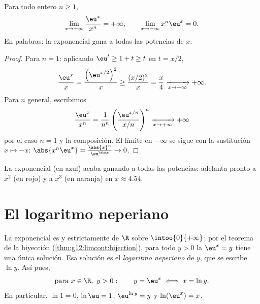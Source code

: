 \begin{theorem}\label{thm:g12:exp:growth}
Para todo entero $n \geq 1$,
\[
\lim_{x\to+\infty} \frac{\eu^x}{x^n} = +\infty,
\qquad
\lim_{x\to-\infty} x^n \eu^x = 0 .
\]
En palabras: la exponencial gana a todas las potencias de $x$.
\end{theorem}

\begin{proof}
Para $n = 1$: aplicando $\eu^t \geq 1 + t \geq t$ en $t = x/2$,
\[
\frac{\eu^x}{x} = \frac{\left(\eu^{x/2}\right)^2}{x}
\geq \frac{(x/2)^2}{x} = \frac{x}{4} \xrightarrow[x\to+\infty]{} +\infty .
\]
Para $n$ general, escribimos
\[
\frac{\eu^x}{x^n}
= \frac{1}{n^n}\left(\frac{\eu^{x/n}}{x/n}\right)^{n}
\xrightarrow[x\to+\infty]{} +\infty
\]
por el caso $n=1$ y la composición. El límite en $-\infty$ se sigue con la
sustitución $x \mapsto -x$:
$\abs{x^n \eu^x} = \frac{\abs{x}^n}{\eu^{\abs x}} \to 0$.
\end{proof}

\begin{omfigure}

{\small La exponencial (en azul) acaba ganando a todas las potencias:
adelanta pronto a $x^2$ (en rojo) y a $x^3$ (en naranja) en
$x \approx 4.54$.}
\end{omfigure}

\section{El logaritmo neperiano}

\begin{definition}\label{def:g12:exp:ln}
La exponencial es  y estrictamente  de $\R$ sobre
$\intoo{0}{+\infty}$; por el teorema de la biyección
(\cref{thm:g12:limcont:bijection}), para todo $y > 0$ la 
$\eu^x = y$ tiene una única solución. Esa solución es el \emph{logaritmo
neperiano} de $y$, que se escribe $\ln y$. Así pues,
\[
\text{para } x \in \R,\ y > 0: \qquad y = \eu^x \iff x = \ln y .
\]
En particular, $\ln 1 = 0$, $\ln \eu = 1$, $\eu^{\ln y} = y$ y
$\ln(\eu^x) = x$.
\end{definition}

